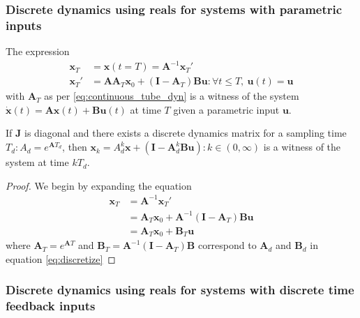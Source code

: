 \documentclass[sigconf]{llncs}
\newcommand{\mat}[1]{\boldsymbol{#1}}
\renewcommand{\vec}[1]{\boldsymbol{#1}}
\begin{document}
 \subsubsection{Discrete dynamics using reals for systems with parametric inputs}\label{asec:real_discrete_param_inputs}
\begin{theorem}
The expression
 \begin{align}
 \vec{x}_T&=\vec{x}(t=T)=\mat{A}^{-1}\vec{x}_T'\nonumber\\
\vec{x}_T'&=\mat{A}\mat{A}_T\vec{x}_0 + (\mat{I}-\mat{A}_T)\mat{B}\vec{u} : \forall t \leq T,\ \vec{u}(t)=\vec{u} 
 \end{align}
 with $\mat{A}_T$ as per \eqref{eq:continuous_tube_dyn} is a witness of the system $\dot{\vec{x}}(t)=\mat{A}\vec{x}(t)+\mat{B}\vec{u}(t)$ at time $T$ given a parametric input $\vec{u}$.
 \end{theorem}
 \begin{corollary}
 If $\mat{J}$ is diagonal and there exists a discrete dynamics matrix for a sampling time $T_d :  A_d=e^{\mat{A} T_d}$, then $\vec{x}_k=A_d^k\vec{x}+(\mat{I}-\mat{A}_d^k\mat{B}\vec{u}) : k \in (0,\infty)$ is a witness of the system at time $kT_d$.
 \end{corollary}
 \begin{proof}
 We begin by expanding the equation
 \begin{align}
 \vec{x}_T&=\mat{A}^{-1}\vec{x}_T'\nonumber\\
 &=\mat{A}_T\vec{x}_0 + \mat{A}^{-1}(\mat{I}-\mat{A}_T)\mat{B}\vec{u}\nonumber\\
 &= \mat{A}_T\vec{x}_0 + \mat{B}_T\vec{u}
 \end{align}
 where $\mat{A}_T=e^{\mat{A}T}$ and $\mat{B}_T=\mat{A}^{-1}(\mat{I}-\mat{A}_T)\mat{B}$ correspond to $\mat{A}_d$ and $\mat{B}_d$ in equation \eqref{eq:discretize}
 \end{proof}

 \subsubsection{Discrete dynamics using reals for systems with discrete time feedback inputs}\label{asec:real_discrete_feedback_inputs}
\end{document}
